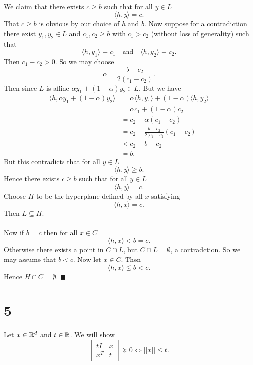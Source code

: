 \documentclass[letterpaper,12pt,oneside,onecolumn]{article}
\begin{document}
\paragraph{}
We claim that there exists $c\geq b$ such that for all $y \in L$
$$\langle h, y \rangle = c.$$
That $c \geq b$ is obvious by our choice of $h$ and $b$. Now suppose for a contradiction there exist $y_1, y_2 \in L$ and $c_1, c_2 \geq b$ with $c_1 > c_2$ (without loss of generality) such that $$\langle h, y_1 \rangle = c_1 \quad\text{and}\quad \langle h, y_2 \rangle = c_2.$$
Then $c_1 - c_2 > 0$. So we may choose
$$\alpha = \frac{b-c_2}{2(c_1-c_2)}.$$
Then since $L$ is affine $\alpha y_1 + (1-\alpha) y_2 \in L$. But we have
\begin{align*}
\langle h, \alpha y_1 + (1-\alpha) y_2 \rangle &= \alpha \langle h,y_1\rangle + (1- \alpha) \langle h, y_2 \rangle \\
&= \alpha c_1 + (1-\alpha) c_2 \\
&= c_2 + \alpha (c_1 - c_2) \\
&= c_2 + \frac{b-c_2}{2(c_1-c_2}(c_1-c_2) \\
&< c_2 + b-c_2 \\
&= b. 
\end{align*}
But this contradicts that for all $y \in L$
$$\langle h, y \rangle \geq b.$$
Hence there exists $c \geq b$ such that for all $y \in L$
$$\langle h, y \rangle = c.$$
Choose $H$ to be the hyperplane defined by all $x$ satisfying
$$\langle h, x \rangle = c.$$
Then $L \subseteq H$. 
\paragraph{}
Now if $b=c$ then for all $x  \in C$ 
$$\langle h, x \rangle < b=c.$$
Otherwise there exists a point in $C \cap L$, but $C\cap L = \emptyset$, a contradction. So we may assume that $b < c$. Now let $x \in C$. Then
$$
\langle h, x \rangle  \leq b < c.
$$
Hence $H \cap C = \emptyset$. $\blacksquare$
\section*{5}
\paragraph{}
Let $x \in \mathbb{R}^d$ and $t\in \mathbb{R}$. We will show
$$\begin{bmatrix}tI & x \\ x^T & t \end{bmatrix} \succcurlyeq 0 \iff ||x|| \leq t.$$
\end{document}
